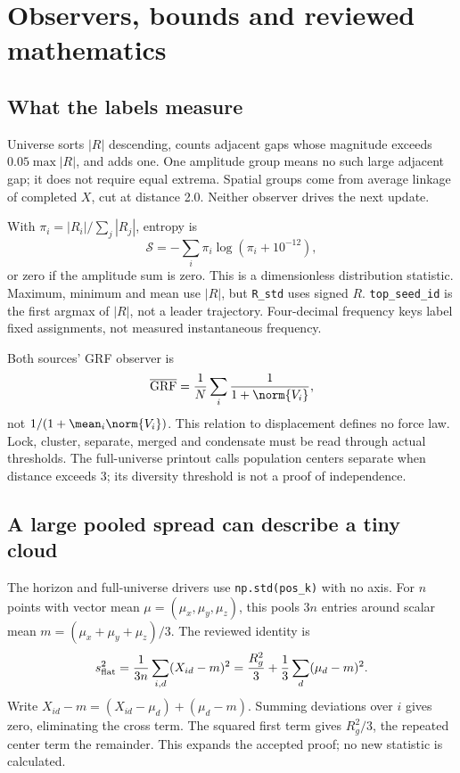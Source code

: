 \section{Observers, bounds and reviewed mathematics}\label{sec:observers}
\subsection{What the labels measure}
Universe sorts \(|R|\) descending, counts adjacent gaps whose magnitude exceeds \(0.05\max|R|\), and adds one. One amplitude group means no such large adjacent gap; it does not require equal extrema. Spatial groups come from average linkage of completed \(X\), cut at distance 2.0. Neither observer drives the next update.

With \(\pi_i=|R_i|/\sum_j|R_j|\), entropy is
\begin{equation}
\mathcal S=-\sum_i\pi_i\log(\pi_i+10^{-12}),
\end{equation}
or zero if the amplitude sum is zero. This is a dimensionless distribution statistic. Maximum, minimum and mean use \(|R|\), but \texttt{R\_std} uses signed \(R\). \texttt{top\_seed\_id} is the first argmax of \(|R|\), not a leader trajectory. Four-decimal frequency keys label fixed assignments, not measured instantaneous frequency.

Both sources' GRF observer is
\begin{equation}\label{eq:grf}
\overline{\mathrm{GRF}}=\frac1N\sum_i\frac1{1+\norm{V_i}},
\end{equation}
not \(1/(1+\mean_i\norm{V_i})\). This relation to displacement defines no force law. Lock, cluster, separate, merged and condensate must be read through actual thresholds. The full-universe printout calls population centers separate when distance exceeds 3; its diversity threshold is not a proof of independence.

\subsection{A large pooled spread can describe a tiny cloud}\label{sec:pooled}
The horizon and full-universe drivers use \texttt{np.std(pos\_k)} with no axis. For \(n\) points with vector mean \(\mu=(\mu_x,\mu_y,\mu_z)\), this pools \(3n\) entries around scalar mean \(m=(\mu_x+\mu_y+\mu_z)/3\). The reviewed identity is
\begin{equation}\label{eq:pooled}
s_{\rm flat}^2=\frac1{3n}\sum_{i,d}(X_{id}-m)^2
=\frac{R_g^2}{3}+\frac13\sum_d(\mu_d-m)^2.
\end{equation}
Write \(X_{id}-m=(X_{id}-\mu_d)+(\mu_d-m)\). Summing deviations over \(i\) gives zero, eliminating the cross term. The squared first term gives \(R_g^2/3\), the repeated center term the remainder. This expands the accepted proof; no new statistic is calculated.

